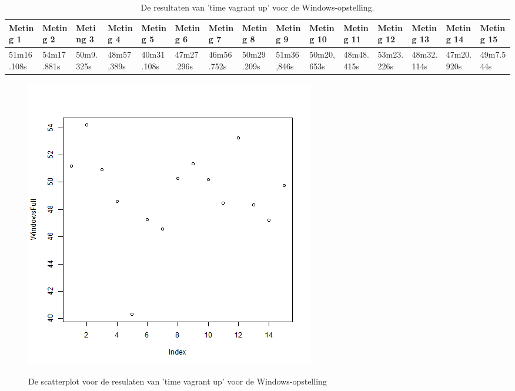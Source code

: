 \begin{table}
	\centering
	\begin{tabular}{lllllllllllllll}
		\hline
		Meting 1 & Meting 2 & Meting 3 & Meting 4 & Meting 5 & Meting 6 & Meting 7 & Meting 8 & Meting 9 & Meting 10 & Meting 11 & Meting 12 & Meting 13 & Meting 14 & Meting 15 \\
		\hline
		51m16.108s & 54m17.881s & 50m9.325s & 48m57,389s & 40m31.108s & 47m27.296s & 46m56.752s & 50m29.209s & 51m36,846s & 50m20,653s & 48m48.415s & 53m23.226s & 48m32.114s & 47m20.920s & 49m7.544s \\
		\hline
	\end{tabular}
	\caption{De resultaten van 'time vagrant up' voor de Windows-opstelling.}
	\label{tab:timevagrantupwindows}
\end{table}

\begin{figure}
	\centering
	\caption{De scatterplot voor de resulaten van 'time vagrant up' voor de Windows-opstelling}
	\includegraphics[scale=0.5]{img/windowsplotfull.png}
	\label{fig:windowsupplot}
\end{figure}

